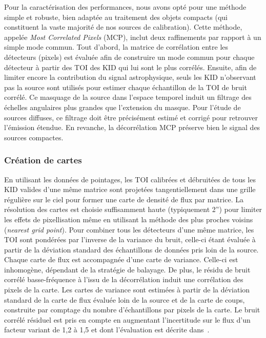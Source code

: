 Pour la caractérisation des performances, nous avons opté pour une
méthode simple et robuste, bien adaptée au traitement des objets
compacts (qui constituent la vaste majorité de nos sources de
calibration). Cette méthode, appelée \emph{Most Correlated Pixels} (MCP),
inclut deux raffinements par rapport à un simple mode commun. Tout
d'abord, la matrice de corrélation entre les détecteurs (pixels) est
évaluée afin de construire un mode commun pour chaque détecteur à
partir des TOI des KID qui lui sont le plus corrélés. Ensuite, afin de
limiter encore la contribution du signal astrophysique, seuls les KID
n'observant pas la source sont utilisés pour estimer chaque
échantillon de la TOI de bruit corrélé. Ce masquage de la source dans
l'espace temporel induit un filtrage des échelles angulaires plus
grandes que l'extension du masque. Pour l'étude de sources diffuses,
ce filtrage doit être précisément estimé et corrigé pour retrouver
l'émission étendue. En revanche, la décorrélation MCP préserve bien le
signal des sources compactes. 

\subsubsection{Création de cartes} En utilisant les données de
pointages, les TOI calibrées et débruitées de tous les KID valides
d'une même matrice sont projetées tangentiellement dans une grille
régulière sur le ciel pour former une carte de densité de flux par
matrice. La résolution des cartes est choisie suffisamment haute
(typiquement 2'') pour limiter les effets de pixellisation
même en utilisant la méthode des plus proches voisins (\emph{nearest
  grid point}). Pour combiner tous les détecteurs d'une même matrice,
les TOI sont pondérées par l'inverse de la variance du bruit, celle-ci
étant évaluée à partir de la déviation standard des échantillons de
données pris loin de la source. Chaque carte de flux est accompagnée
d'une carte de variance. Celle-ci est inhomogène, dépendant de la
stratégie de balayage. De plus, le résidu de bruit corrélé
basse-fréquence à l'issu de la décorrélation induit une corrélation
des pixels de la carte. Les cartes de variance sont estimées à partir
de la déviation standard de la carte de flux évaluée loin de
la source et de la carte de coups, construite par comptage du
nombre d'échantillons par pixels de la carte. Le bruit corrélé
résiduel est pris en compte en augmentant l'incertitude sur le flux
d'un facteur variant de 1,2 à 1,5 et dont l'évaluation est décrite
dans~\citet{Perotto2019}.\\

